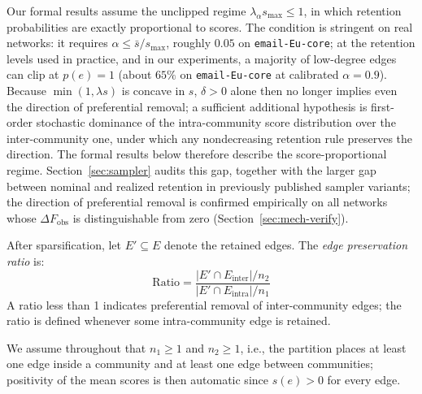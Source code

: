 \begin{remark}[Clipping]
\label{rem:clipping}
Our formal results assume the unclipped regime $\lambda_\alpha s_{\max} \le 1$, in which retention probabilities are exactly proportional to scores. The condition is stringent on real networks: it requires $\alpha \le \bar{s}/s_{\max}$, roughly $0.05$ on \texttt{email-Eu-core}; at the retention levels used in practice, and in our experiments, a majority of low-degree edges can clip at $p(e)=1$ (about $65\%$ on \texttt{email-Eu-core} at calibrated $\alpha=0.9$). Because $\min(1,\lambda s)$ is concave in $s$, $\delta>0$ alone then no longer implies even the direction of preferential removal; a sufficient additional hypothesis is first-order stochastic dominance of the intra-community score distribution over the inter-community one, under which any nondecreasing retention rule preserves the direction. The formal results below therefore describe the score-proportional regime. Section~\ref{sec:sampler} audits this gap, together with the larger gap between nominal and realized retention in previously published sampler variants; the direction of preferential removal is confirmed empirically on all networks whose $\Delta F_{\mathrm{obs}}$ is distinguishable from zero (Section~\ref{sec:mech-verify}).
\end{remark}

\begin{definition}
After sparsification, let $E' \subseteq E$ denote the retained edges. The \emph{edge preservation ratio} is:
\begin{equation}
\text{Ratio} = \frac{|E' \cap E_{\text{inter}}| / n_2}{|E' \cap E_{\text{intra}}| / n_1}
\end{equation}
A ratio less than 1 indicates preferential removal of inter-community edges; the ratio is defined whenever some intra-community edge is retained.
\end{definition}

\begin{assumption}
\label{ass:nondegen}
We assume throughout that $n_1 \geq 1$ and $n_2 \geq 1$, i.e., the partition places at least one edge inside a community and at least one edge between communities; positivity of the mean scores is then automatic since $s(e) > 0$ for every edge.
\end{assumption}

